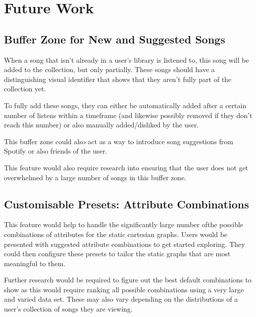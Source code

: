
\section{Future Work}
\subsection{Buffer Zone for New and Suggested Songs}
When a song that isn't already in a user's library is listened to, this song will be added to the collection, but only partially. These songs should have a distinguishing visual identifier that shows that they aren't fully part of the collection yet.

To fully add these songs, they can either be automatically added after a certain number of listens within a timeframe (and likewise possibly removed if they don't reach this number) or also manually added/disliked by the user.

This buffer zone could also act as a way to introduce song suggestions from Spotify or also friends of the user.

This feature would also require research into ensuring that the user does not get overwhelmed by a large number of songs in this buffer zone.

\subsection{Customisable Presets: Attribute Combinations}
This feature would help to handle the significantly large number ofthe possible combinations of attributes for the static cartesian graphs. Users would be presented with suggested attribute combinations to get started exploring. They could then configure these presets to tailor the static graphs that are most meaningful to them.

Further research would be required to figure out the best default combinations to show as this would require ranking all possible combinations using a very large and varied data set. These may also vary depending on the distributions of a user's collection of songs they are viewing.

